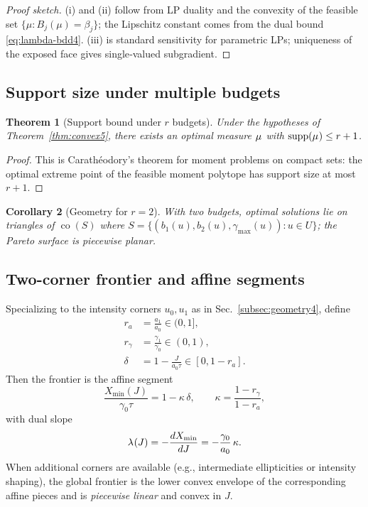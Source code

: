 \documentclass[aps,pre,twocolumn,showpacs,superscriptaddress]{revtex4-2}
\newtheorem{theorem}{Theorem}
\newtheorem{corollary}[theorem]{Corollary}
\theoremstyle{definition}
\begin{document}
\begin{proof}[Proof sketch]
(i) and (ii) follow from LP duality and the convexity of the feasible set $\{\mu:B_j(\mu)=\beta_j\}$; the Lipschitz constant comes from the dual bound \eqref{eq:lambda-bdd4}. (iii) is standard sensitivity for parametric LPs; uniqueness of the exposed face gives single‑valued subgradient.
\end{proof}

\subsection{Support size under multiple budgets}\label{subsec:support5}

\begin{theorem}[Support bound under $r$ budgets]\label{thm:support5}
Under the hypotheses of Theorem~\ref{thm:convex5}, there exists an optimal measure $\mu^{\*}$ with $\operatorname{supp}(\mu^{\*})\le r+1$.
\end{theorem}

\begin{proof}
This is Carath\'eodory’s theorem for moment problems on compact sets: the optimal extreme point of the feasible moment polytope has support size at most $r+1$.
\end{proof}

\begin{corollary}[Geometry for $r=2$]
With two budgets, optimal solutions lie on \emph{triangles} of $\operatorname{co}(S)$ where $S=\{(b_1(u),b_2(u),\gamma_{\max}(u)):u\in U\}$; the Pareto surface is piecewise planar.
\end{corollary}

\subsection{Two-corner frontier and affine segments}\label{subsec:twocorner5}

Specializing to the intensity corners $u_0,u_1$ as in Sec.~\ref{subsec:geometry4}, define
\begin{align}
r_a&=\frac{a_1}{a_0}\in(0,1],\\
r_\gamma&=\frac{\gamma_1}{\gamma_0}\in(0,1),\nonumber\\
\delta&=1-\frac{J}{a_0\tau}\in[0,1-r_a].\nonumber
\end{align}
Then the frontier is the affine segment
\begin{equation}\label{eq:affine5}
\frac{X_{\min}(J)}{\gamma_0\tau}=1-\kappa\,\delta,\qquad \kappa=\frac{1-r_\gamma}{1-r_a},
\end{equation}
with dual slope
\begin{equation}\label{eq:lambda5}
\lambda^{\*}(J)=-\frac{dX_{\min}}{dJ}=-\frac{\gamma_0}{a_0}\,\kappa.
\end{equation}
When additional corners are available (e.g., intermediate ellipticities or intensity shaping), the global frontier is the lower convex envelope of the corresponding affine pieces and is \emph{piecewise linear} and convex in $J$.
\end{document}
